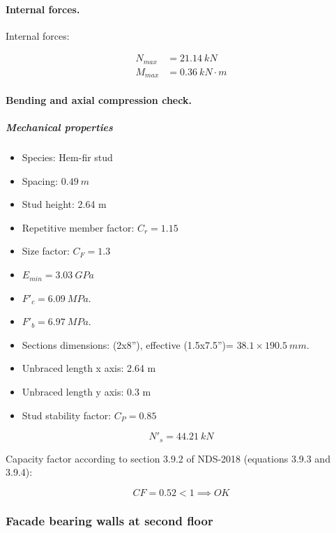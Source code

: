 \paragraph{Internal forces.}

\noindent Internal forces:

\begin{align}
  N_{max}&= 21.14\ kN \\
  M_{max}&= 0.36\ kN \cdot m
\end{align}

\paragraph{Bending and axial compression check.}

\subparagraph{Mechanical properties}

\begin{itemize}
\item Species: Hem-fir stud
\item Spacing: $0.49\ m$
\item Stud height: 2.64 m
\item Repetitive member factor: $C_r= 1.15$
\item Size factor: $C_F= 1.3$
\item $E_{min}= 3.03\ GPa$
\item $F'_c= 6.09\ MPa$.
\item $F'_b= 6.97\ MPa$.
\item Sections dimensions: (2x8''), effective (1.5x7.5'')= $38.1 \times 190.5\ mm$.
\item Unbraced length x axis: 2.64 m
\item Unbraced length y axis: 0.3 m
\item Stud stability factor: $C_P= 0.85$
\end{itemize}

\begin{equation}
  N'_s= 44.21\ kN
\end{equation}

\noindent Capacity factor according to section 3.9.2 of NDS-2018 (equations 3.9.3 and 3.9.4):

\begin{equation}
  CF= 0.52 < 1 \implies OK
\end{equation}

\subsubsection{Facade bearing walls at second floor}

